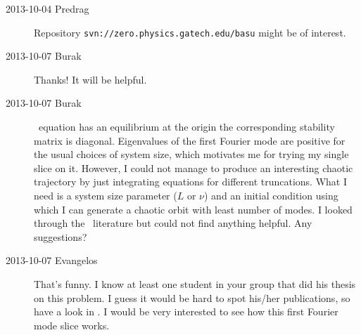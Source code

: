 \begin{description}
\item[2013-10-04 Predrag]
Repository \texttt{svn://zero.physics.gatech.edu/basu} might be of interest.

\item[2013-10-07 Burak] Thanks! It will be helpful.

\item[2013-10-07 Burak] \KS\ equation has an equilibrium at the origin the
corresponding stability matrix is diagonal. Eigenvalues of the first Fourier
mode are positive for the usual choices of system size, which motivates me 
for trying my single slice on it. However, I could not manage to produce an
interesting chaotic trajectory by just integrating equations for different 
truncations. What I need is a system size parameter ($L$ or $\nu$) and an
initial condition using which I can generate a chaotic orbit with least 
number of modes. I looked through the \KS\ literature but could not find 
anything helpful. Any suggestions?

\item[2013-10-07 Evangelos] That's funny. I know at least one student in your
group that did his thesis on this problem. I guess it would be hard to spot
his/her publications, so have a look in .
I would be very interested to see how this first Fourier mode slice works.

\end{description}
\renewcommand{\ssp}{a}
